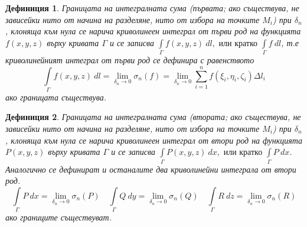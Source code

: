 \documentclass[a4paper,fleqn,12pt]{article}
\newtheorem{definition}{Дефиниция}[subsection]
\theoremstyle{definition}
\begin{document}
\begin{definition}
Границата на интегралната сума (първата; ако съществува, не зависейки нито от начина на разделяне, нито от избора на точките $M_i$) при $\delta_n$, клоняща към нула се нарича криволинеен интеграл от първи род на функцията $f(x,y,z)$ върху кривата $\Gamma$ и се записва $\int\limits_{\Gamma} f(x,y,z) \ dl, \text{ или кратко } \int\limits_{\Gamma} f\ dl$, т.е криволинейният интеграл от първи род се дефинира с равенството 
$$\int\limits_{\Gamma} f(x,y,z) \ dl = \lim\limits_{\delta_n \to 0} \sigma_n (f) = \lim\limits_{\delta_n \to 0} \sum_{i=1} ^n f(\xi_i,\eta_i,\zeta_i) \Delta l_i$$
ако границата съществува.
\end{definition}

\begin{definition}
Границата на интегралната сума (втората; ако съществува, не зависейки нито от начина на разделяне, нито от избора на точките $M_i$) при $\delta_n$, клоняща към нула се нарича криволинеен интеграл от втори род на функцията $P(x,y,z)$ върху кривата $\Gamma$ и се записва $\int\limits_{\Gamma} P(x,y,z) \ dx, \text{ или кратко } \int\limits_{\Gamma} P\ dx$. Аналогично се дефинират и останалите два криволинейни интеграла от втори род. 
$$
\int\limits_{\Gamma} P \ dx = \lim\limits_{\delta_n \to 0} \sigma_n (P) \quad 
\int\limits_{\Gamma} Q \ dy = \lim\limits_{\delta_n \to 0} \sigma_n (Q) \quad 
\int\limits_{\Gamma} R \ dz = \lim\limits_{\delta_n \to 0} \sigma_n (R) 
$$
ако границите съществуват.
\end{definition}
\end{document}
